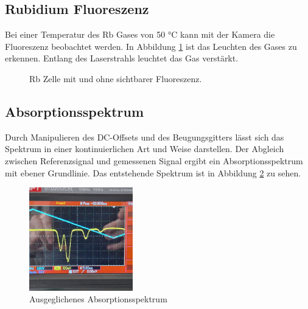\subsection{Rubidium Fluoreszenz}
Bei einer Temperatur des Rb Gases von 50 °C kann mit der Kamera die Fluoreszenz beobachtet werden.
In Abbildung \ref{fig:rb_fluoreszenz} ist das Leuchten des Gases zu erkennen.
Entlang des Laserstrahls leuchtet das Gas verstärkt.
\begin{figure}
    \centering
    \hfill
    \caption{Rb Zelle mit und ohne sichtbarer Fluoreszenz.}\label{fig:rb_fluoreszenz}
\end{figure}

\subsection{Absorptionsspektrum}
Durch Manipulieren des DC-Offsets und des Beugungsgitters
lässt sich das Spektrum in einer kontinuierlichen Art und Weise darstellen.
Der Abgleich zwischen Referenzsignal und gemessenen Signal ergibt ein Absorptionsspektrum mit ebener Grundlinie.
Das entstehende Spektrum ist in Abbildung \ref{fig:spektrum} zu sehen.

\begin{figure}
    \centering
    \includegraphics[width=0.4\textwidth]{./Materialien/spektrum.jpeg}
	\caption{Ausgeglichenes Absorptionsspektrum}\label{fig:spektrum}
\end{figure}

